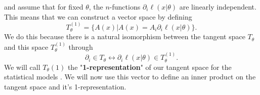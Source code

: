 and assume that for fixed $\theta$, the $n$-functions $\partial_i \ell(x|\theta)$ are linearly independent. This means that we can construct a vector space by defining \cite{AmarisLectureNotes}
\begin{equation}
	T_\theta^{(1)} = \{A(x) | A(x) = A_i \partial_i \ell(x|\theta)\}.
\end{equation}
We do this because there is a natural isomorphism between the tangent space $T_\theta$ and this space $T_\theta^{(1)}$ through \cite{AmarisLectureNotes}
\begin{equation}
	\partial_i \in T_\theta \leftrightarrow \partial_i \ell(x|\theta) \in T_\theta^{(1)}.
\end{equation}
We will call $T_\theta{(1)}$ the "\textbf{1-representation}" of our tangent space for the statistical models \cite{AmarisLectureNotes}. We will now use this vector to define an inner product on the tangent space and it's 1-representation.\\
